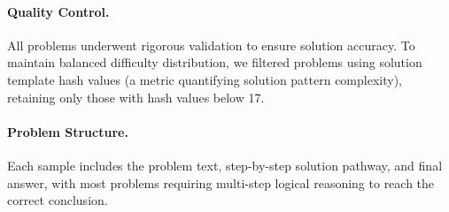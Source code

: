 \documentclass{article} %
\begin{document}
\paragraph{Quality Control.} All problems underwent rigorous validation to ensure solution accuracy. To maintain balanced difficulty distribution, we filtered problems using solution template hash values (a metric quantifying solution pattern complexity), retaining only those with hash values below 17.

\paragraph{Problem Structure.} Each sample includes the problem text, step-by-step solution pathway, and final answer, with most problems requiring multi-step logical reasoning to reach the correct conclusion.
\end{document}
